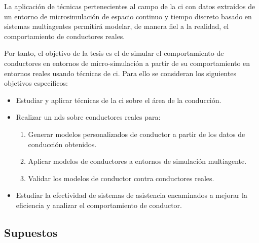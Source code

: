 \begin{hyp} \label{hyp:hypothesis-1}
	La aplicación de técnicas pertenecientes al campo de la \ac{ci} con datos extraídos de un entorno de microsimulación de espacio continuo y tiempo discreto basado en sistemas multiagentes permitirá modelar, de manera fiel a la realidad, el comportamiento de conductores reales.
\end{hyp}

Por tanto, el objetivo de la tesis es el de simular el comportamiento de conductores en entornos de micro-simulación a partir de su comportamiento en entornos reales usando técnicas de \ac{ci}. Para ello se consideran los siguientes objetivos específicos:

\begin{itemize}
	\item Estudiar y aplicar técnicas de la \ac{ci} sobre el área de la conducción.
	\item Realizar un \gls{nds} sobre conductores reales para:
	\begin{enumerate}
		\item Generar modelos personalizados de conductor a partir de los datos de conducción obtenidos.
		\item Aplicar modelos de conductores a entornos de simulación multiagente.
		\item Validar los modelos de conductor contra conductores reales.
	\end{enumerate}
	\item Estudiar la efectividad de sistemas de asistencia encaminados a mejorar la eficiencia y analizar el comportamiento de conductor.
\end{itemize}

\subsection{Supuestos}


